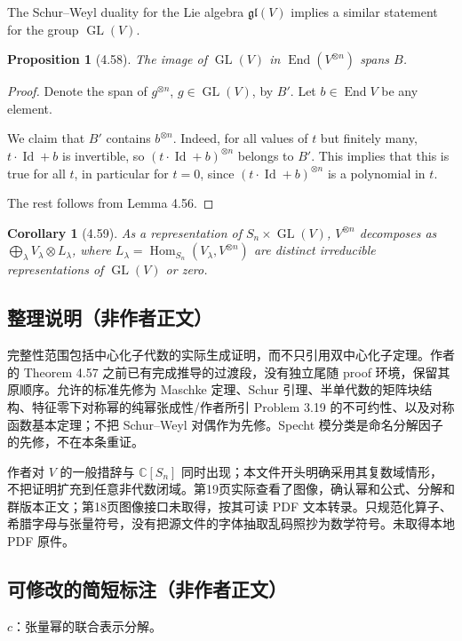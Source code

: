 \documentclass[UTF8,11pt]{ctexart}
\newtheorem*{proposition}{Proposition}
\newtheorem*{corollary}{Corollary}
\theoremstyle{definition}
\DeclareMathOperator{\Hom}{Hom}
\newcommand{\C}{\mathbb C}
\begin{document}
The Schur--Weyl duality for the Lie algebra $\mathfrak{gl}(V)$ implies a similar statement for the group $\operatorname{GL}(V)$.
\begin{proposition}[4.58]
The image of $\operatorname{GL}(V)$ in $\operatorname{End}(V^{\otimes n})$ spans $B$.
\end{proposition}
\begin{proof}
Denote the span of $g^{\otimes n}$, $g\in\operatorname{GL}(V)$, by $B'$. Let $b\in\operatorname{End}V$ be any element.

We claim that $B'$ contains $b^{\otimes n}$. Indeed, for all values of $t$ but finitely many, $t\cdot\operatorname{Id}+b$ is invertible, so $(t\cdot\operatorname{Id}+b)^{\otimes n}$ belongs to $B'$. This implies that this is true for all $t$, in particular for $t=0$, since $(t\cdot\operatorname{Id}+b)^{\otimes n}$ is a polynomial in $t$.

The rest follows from Lemma 4.56.
\end{proof}
\begin{corollary}[4.59]
As a representation of $S_n\times\operatorname{GL}(V)$, $V^{\otimes n}$ decomposes as $\bigoplus_\lambda V_\lambda\otimes L_\lambda$, where $L_\lambda=\Hom_{S_n}(V_\lambda,V^{\otimes n})$ are distinct irreducible representations of $\operatorname{GL}(V)$ or zero.
\end{corollary}

\subsection*{整理说明（非作者正文）}
完整性范围包括中心化子代数的实际生成证明，而不只引用双中心化子定理。作者的 Theorem 4.57 之前已有完成推导的过渡段，没有独立尾随 proof 环境，保留其原顺序。允许的标准先修为 Maschke 定理、Schur 引理、半单代数的矩阵块结构、特征零下对称幂的纯幂张成性/作者所引 Problem 3.19 的不可约性、以及对称函数基本定理；不把 Schur--Weyl 对偶作为先修。Specht 模分类是命名分解因子的先修，不在本条重证。

作者对 $V$ 的一般措辞与 $\C[S_n]$ 同时出现；本文件开头明确采用其复数域情形，不把证明扩充到任意非代数闭域。第19页实际查看了图像，确认幂和公式、分解和群版本正文；第18页图像接口未取得，按其可读 PDF 文本转录。只规范化算子、希腊字母与张量符号，没有把源文件的字体抽取乱码照抄为数学符号。未取得本地 PDF 原件。
\subsection*{可修改的简短标注（非作者正文）}
$c$：张量幂的联合表示分解。
\end{document}
